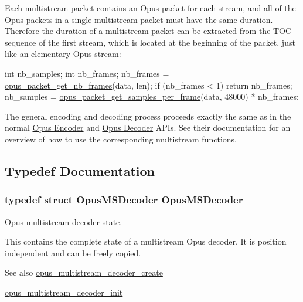 Each multistream packet contains an Opus packet for each stream, and all of the Opus packets in a single multistream packet must have the same duration. Therefore the duration of a multistream packet can be extracted from the T\+OC sequence of the first stream, which is located at the beginning of the packet, just like an elementary Opus stream\+:


\begin{DoxyCode}
\textcolor{keywordtype}{int} nb\_samples;
\textcolor{keywordtype}{int} nb\_frames;
nb\_frames = \hyperlink{group__opus__decoder_ga064cb2ed9e77a934cd7db6c13b02c584}{opus\_packet\_get\_nb\_frames}(data, len);
\textcolor{keywordflow}{if} (nb\_frames < 1)
  \textcolor{keywordflow}{return} nb\_frames;
nb\_samples = \hyperlink{group__opus__decoder_gab2a955acced631c6cb7876bbdc7953d4}{opus\_packet\_get\_samples\_per\_frame}(data, 48000) * nb\_frames;
\end{DoxyCode}


The general encoding and decoding process proceeds exactly the same as in the normal \hyperlink{group__opus__encoder}{Opus Encoder} and \hyperlink{group__opus__decoder}{Opus Decoder} A\+P\+Is. See their documentation for an overview of how to use the corresponding multistream functions. 

\subsection{Typedef Documentation}
\subsubsection[{\texorpdfstring{Opus\+M\+S\+Decoder}{OpusMSDecoder}}]{\setlength{\rightskip}{0pt plus 5cm}typedef struct {\bf Opus\+M\+S\+Decoder} {\bf Opus\+M\+S\+Decoder}}\hypertarget{group__opus__multistream_gad3497495deb9a8ace82e76cd4f93e0e4}{}\label{group__opus__multistream_gad3497495deb9a8ace82e76cd4f93e0e4}


Opus multistream decoder state. 

This contains the complete state of a multistream Opus decoder. It is position independent and can be freely copied. \begin{DoxySeeAlso}{See also}
\hyperlink{group__opus__multistream_ga3c0e342774174c471e61cedba53755c9}{opus\+\_\+multistream\+\_\+decoder\+\_\+create} 

\hyperlink{group__opus__multistream_ga09a4d14fc497d4f6fbe76bd1c5d45436}{opus\+\_\+multistream\+\_\+decoder\+\_\+init} 
\end{DoxySeeAlso}
